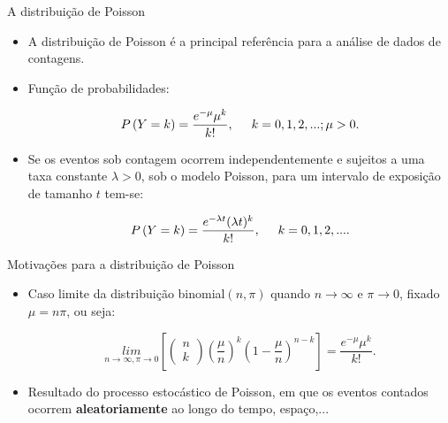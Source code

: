 \documentclass[10pt, aspectratio=169]{beamer}
\begin{document}


\begin{frame}{A distribuição de Poisson}
    
    \begin{itemize}
        \item A distribuição de Poisson é a principal referência para a análise de dados de contagens.
 \vspace{0,3cm}       
        \item Função de probabilidades:

        
$$
    P\left ( Y=k \right )=\frac{e^{-\mu}\mu^{k}}{k!},\hspace{5mm}k=0,1,2,...; \mu>0.
$$
 
   \vspace{0,2cm}    
   
       \item Se os eventos sob contagem  ocorrem independentemente e sujeitos a uma taxa constante $\lambda >0$, sob o modelo Poisson,  para um intervalo de exposição de tamanho $t$ tem-se: 
  
$$
    P\left ( Y=k \right )=\frac{e^{-\lambda t}(\lambda t)^{k}}{k!},\hspace{5mm}k=0,1,2,....
$$
        \end{itemize}
        
\end{frame}



\begin{frame}{Motivações para a distribuição de Poisson}
    


    \vspace{0,5cm}
    
    \begin{itemize}
        \item Caso limite da distribuição binomial$(n, \pi)$ quando $n\rightarrow \infty$ e $\pi\rightarrow 0$, fixado $\mu=n\pi$, ou seja:

$$
     \underset{n \to \infty, \pi \to 0 }{lim}
\left [ \begin{pmatrix}
 n\\k 
\end{pmatrix} \left ( \frac{\mu}{n} \right )^{k}\left ( 1-\frac{\mu}{n} \right )^{n-k}\right ]=\frac{e^{-\mu}\mu^{k}}{k!}.
$$

    \vspace{0,5cm}

        \item Resultado do processo estocástico de Poisson, em que os eventos contados ocorrem \textbf{aleatoriamente} ao longo do tempo, espaço,...

    \end{itemize}
    
\end{frame}
\end{document}
